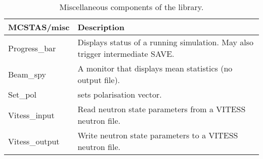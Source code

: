 \begin{table}
  \begin{center}
    {\let\my=\\
    \begin{tabular}{|p{}|p{}|}
      \hline
       {\bf MCSTAS/misc} & Description \\
       \hline
 Progress\_bar     &  Displays status of a running simulation.
                      May also trigger intermediate SAVE.\\
 Beam\_spy         & A monitor that displays mean statistics (no output file). \\
 Set\_pol          & sets polarisation vector. \\
 Vitess\_input     &   Read neutron state parameters from a VITESS neutron file.\\
 Vitess\_output    &  Write neutron state parameters to a VITESS neutron file.\\
      \hline
    \end{tabular}
    \caption{Miscellaneous components of the \MCS library.}
    \label{t:comp-misc}
    }
  \end{center}
\end{table}

